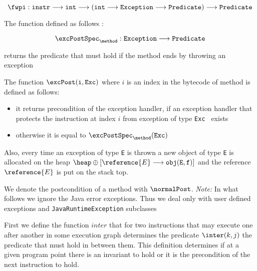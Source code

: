 $$ \fwpi : \tt{ instr} \longrightarrow  \tt{int} \longrightarrow ( int \longrightarrow  \tt{Exception}\longrightarrow  Predicate) \longrightarrow Predicate $$

The function  defined as follows :

$$ \excPostSpec_{\method} : \tt{ Exception  } \longrightarrow Predicate $$ 

returns the predicate that must hold if the method \method ends by throwing an exception 

The function $ \excPost(\tt{i}, \tt{Exc})$ where $i$ is an index in the bytecode of method \method is defined as follows:
\begin{itemize}
	\item it returns precondition  of the exception handler, if an exception handler that protects the instruction at index $i$ from exception of type \texttt{Exc } exists
	\item otherwise it is equal to $\excPostSpec_{\method}( \tt{Exc})$
\end{itemize}

Also, every time an exception of type \texttt{E} is thrown a new object of type  \texttt{E} is allocated on the heap $\heap \oplus [ \reference{E} \longrightarrow  \tt{obj(E, f)}]  $ and the reference $\reference{E}$ is put on the stack top. 

We denote the postcondition of a method with $ \normalPost$.
\textit{Note:} In what follows we ignore the  Java error exceptions. Thus we deal only with user defined exceptions and
 \texttt{JavaRuntimeException} subclasses


First we define the function $inter$ that for two instructions that may execute one 
after another in some execution graph determines the predicate $ \inter(k,j)$ the predicate that must hold in between them. This 
definition determines if at a given program point there is an invariant to hold or it is the precondition of the next instruction to hold.

